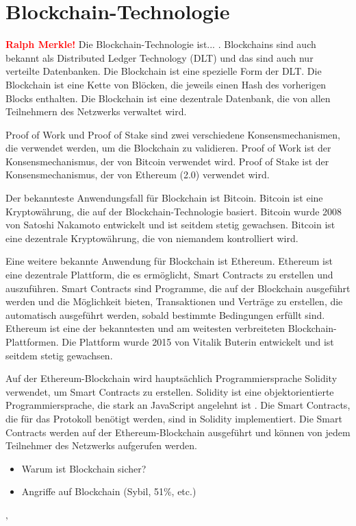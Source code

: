 \section{Blockchain-Technologie}
\textbf{\textcolor{red}{Ralph Merkle!}}
Die Blockchain-Technologie ist... . Blockchains sind auch bekannt als Distributed Ledger 
Technology (DLT) und das sind auch nur verteilte Datenbanken. Die Blockchain ist eine
spezielle Form der DLT. Die Blockchain ist eine Kette von Blöcken, die jeweils einen
Hash des vorherigen Blocks enthalten. Die Blockchain ist eine dezentrale Datenbank, die
von allen Teilnehmern des Netzwerks verwaltet wird.

Proof of Work und Proof of Stake sind zwei verschiedene Konsensmechanismen, die verwendet
werden, um die Blockchain zu validieren. Proof of Work ist der Konsensmechanismus, der
von Bitcoin verwendet wird. Proof of Stake ist der Konsensmechanismus, der von Ethereum (2.0)
verwendet wird.

Der bekannteste Anwendungsfall für Blockchain ist Bitcoin. Bitcoin ist eine Kryptowährung,
die auf der Blockchain-Technologie basiert. Bitcoin wurde 2008 von Satoshi Nakamoto entwickelt
und ist seitdem stetig gewachsen. Bitcoin ist eine dezentrale Kryptowährung, die von niemandem
kontrolliert wird.

Eine weitere bekannte Anwendung für Blockchain ist Ethereum. Ethereum ist eine dezentrale
Plattform, die es ermöglicht, Smart Contracts zu erstellen und auszuführen. Smart Contracts
sind Programme, die auf der Blockchain ausgeführt werden und die Möglichkeit bieten, Transaktionen und
Verträge zu erstellen, die automatisch ausgeführt werden, sobald bestimmte Bedingungen erfüllt sind.
Ethereum ist eine der bekanntesten und am weitesten verbreiteten Blockchain-Plattformen. Die Plattform
wurde 2015 von Vitalik Buterin entwickelt und ist seitdem stetig gewachsen.


Auf der Ethereum-Blockchain wird hauptsächlich Programmiersprache Solidity verwendet, um Smart Contracts zu erstellen. Solidity ist eine objektorientierte Programmiersprache, die stark an JavaScript angelehnt ist \parencite[S. 131]{Antonopoulos_MasteringEthereum}. Die Smart Contracts, die für das Protokoll benötigt werden, sind in Solidity implementiert. Die Smart Contracts werden auf der Ethereum-Blockchain ausgeführt und können von jedem Teilnehmer des Netzwerks aufgerufen werden.

\begin{itemize}
    \item Warum ist Blockchain sicher?
    \item Angriffe auf Blockchain (Sybil, 51\%, etc.)
\end{itemize}


‚